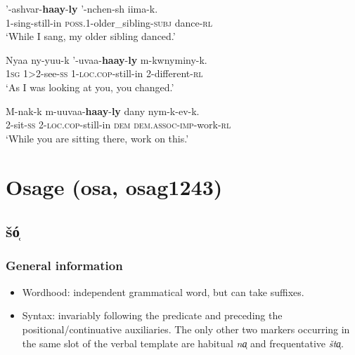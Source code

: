 \begin{exe}
	\ex
	\gll '-ashvar-\textbf{haay}-\textbf{ly} '-nchen-sh iima-k.\\
	1-sing-still-in \textsc{poss}.1-older\_sibling-\textsc{subj} dance-\textsc{rl}\\
	\glt \lq While I sang, my older sibling danced.' \parencite[132]{Gordon1986}

	\ex
	\gll Nyaa ny-yuu-k '-uvaa-\textbf{haay}-\textbf{ly} m-kwnyminy-k.\\
	1\textsc{sg} 1>2-see-\textsc{ss} 1-\textsc{loc}.\textsc{cop}-still-in 2-different-\textsc{rl}\\
	\glt \lq As I was looking at you, you changed.' \parencite[270]{Gordon1986}

	\ex
	\gll M-nak-k m-uuvaa-\textbf{haay}-\textbf{ly} dany nym-k-ev-k.\\
	2-sit-\textsc{ss} 2-\textsc{loc}.\textsc{cop}-still-in \textsc{dem} \textsc{dem}.\textsc{assoc}-\textsc{imp}-work-\textsc{rl}\\
	\glt \lq While you are sitting there, work on this.' \parencite[270]{Gordon1986}
\end{exe}

\section{Osage (osa, osag1243)}
\subsection{šó̜}
\subsubsection{General information}
\begin{itemize}
	\sloppy
	\item Wordhood: independent grammatical word, but can take suffixes.
	\item Syntax:	invariably following the predicate and preceding the positional\slash continuative auxiliaries. The only other two markers occurring in the same slot of the verbal template are habitual \textit{na̜} and frequentative \textit{šta̜}.
\end{itemize}

